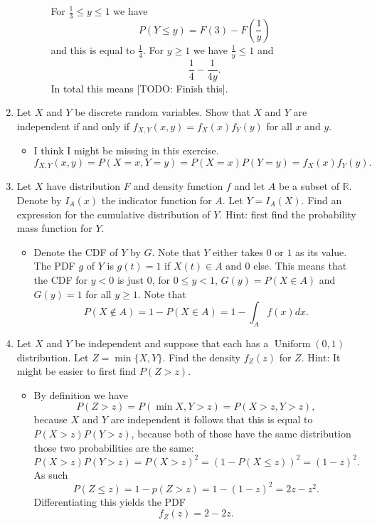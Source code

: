 \documentclass{article}
\begin{document}
\begin{enumerate}
\begin{enumerate}
\begin{itemize}
					For $\frac{1}{3} \leq y \leq 1$ we have
					$$
					P\left(Y \leq y\right) = F(3) - F\left(\frac{1}{y}\right)
					$$
					and this is equal to $\frac{1}{4}$. For $y \geq 1$ we have $\frac{1}{y} \leq 1$ and
					$$
					\frac{1}{4} - \frac{1}{4y}.
					$$
					In total this means [TODO: Finish this].
				\end{itemize}
		\end{enumerate}
	\item Let $X$ and $Y$ be discrete random variables. Show that $X$ and $Y$ are independent if and only if $f_{X, Y}(x, y) = f_X(x)f_Y(y)$ for all $x$ and $y$.
		\begin{itemize}
			\item I think I might be missing in this exercise.
			$$
			f_{X, Y}(x, y)= P(X = x, Y = y) = P(X = x)P(Y = y) = f_X(x)f_Y(y).
			$$
		\end{itemize}
	\item Let $X$ have distribution $F$ and density function $f$ and let $A$ be a subset of $\mathbb{R}$. Denote by $I_A(x)$ the indicator function for $A$. Let $Y = I_A(X)$. Find an expression for the cumulative distribution of $Y$. Hint: first find the probability mass function for $Y$.
		\begin{itemize}
			\item Denote the CDF of $Y$ by $G$. Note that $Y$ either takes $0$ or $1$ as its value. The PDF $g$ of $Y$ is $g(t) = 1$ if $X(t) \in A$ and $0$ else. This means that the CDF for $y < 0$ is just $0$, for $0 \leq y < 1$, $G(y) = P(X \in A)$ and $G(y) = 1$ for all $y \geq 1$. Note that
			$$
			P(X \notin A) = 1 - P(X \in A) = 1 - \int_A f(x) dx.
			$$
		\end{itemize}
	\item Let $X$ and $Y$ be independent and suppose that each has a $\operatorname{Uniform}(0, 1)$ distribution. Let $Z = \min\{X, Y\}$. Find the density $f_Z(z)$ for $Z$. Hint: It might be easier to first find $P(Z > z)$.
		\begin{itemize}
			\item By definition we have 
			$$
			P(Z > z) = P(\min{X, Y} > z) = P(X > z, Y > z),$$
			because $X$ and $Y$ are independent it follows that this is equal to $P(X > z)P(Y > z)$, because both of those have the same distribution those two probabilities are the same:
			$$
			P(X > z)P(Y > z) = P(X > z)^2 = (1 - P(X \leq z))^2 = (1 - z)^2.
			$$
			As such
			$$
			P(Z \leq z) = 1 - p(Z > z) = 1 - (1 - z)^2 = 2z - z^2.
			$$
			Differentiating this yields the PDF
			$$
			f_Z(z) = 2 - 2z.
$$
\end{itemize}
\end{enumerate}
\end{document}
